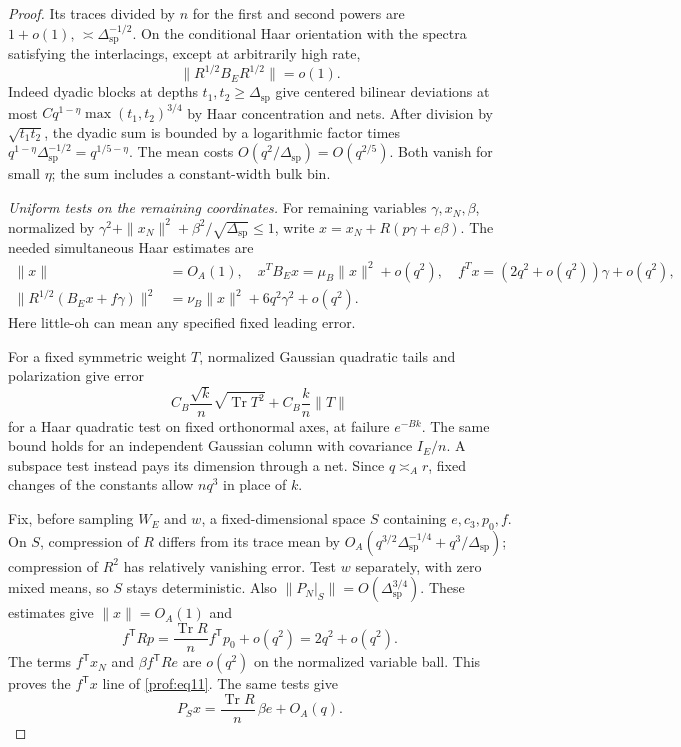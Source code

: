 \begin{proof}
Its traces divided by \(n\) for the first and second powers are \(1+o(1),\,\asymp \Delta_{\mathrm{sp}}^{-1/2}\). On the conditional Haar orientation with the spectra satisfying the interlacings, except at arbitrarily high rate,
\[
 \|R^{1/2}B_E R^{1/2}\|=o(1).
\]
Indeed dyadic blocks at depths $t_1,t_2\ge\Delta_{\mathrm{sp}}$ give
centered bilinear deviations at most
$Cq^{1-\eta}\max(t_1,t_2)^{3/4}$ by Haar concentration and nets.
After division by $\sqrt{t_1t_2}$, the dyadic sum is bounded by a
logarithmic factor times
$q^{1-\eta}\Delta_{\mathrm{sp}}^{-1/2}
=q^{1/5-\eta}$. The mean costs
$O(q^2/\Delta_{\mathrm{sp}})=O(q^{2/5})$. Both vanish for small
$\eta$; the sum includes a constant-width bulk bin.

\par\smallskip\noindent\textit{Uniform tests on the remaining coordinates.}\enspace
For remaining variables \(\gamma,x_N,\beta\), normalized by \(\gamma^2+\|x_N\|^2+\beta^2/\sqrt{\Delta_{\mathrm{sp}}}\le1\), write \(x=x_N+R(p\gamma+e\beta)\). The needed simultaneous Haar estimates are
\begin{equation}\label{prof:eq11}
\begin{split}
 \|x\|&=O_A(1),\quad x^TB_E x=\mu_B\|x\|^2+o(q^2),\quad
 f^T x= (2q^2+o(q^2))\gamma+o(q^2),\\
 \|R^{1/2}(B_E x+f\gamma)\|^2&=\nu_B\|x\|^2+6q^2\gamma^2+o(q^2).
 \end{split}
\end{equation}
Here little-oh can mean any specified fixed leading error.

For a fixed symmetric weight $T$, normalized Gaussian quadratic tails
and polarization give error
\[
 C_B\frac{\sqrt k}{n}\sqrt{\operatorname{Tr}T^2}
       +C_B\frac{k}{n}\|T\|
\]
for a Haar quadratic test on fixed orthonormal axes, at failure
$e^{-Bk}$. The same bound holds for an independent Gaussian column
with covariance $I_E/n$. A subspace test instead pays its dimension
through a net. Since $q\asymp_A r$, fixed changes of the constants
allow $nq^3$ in place of $k$.

Fix, before sampling $W_E$ and $w$, a fixed-dimensional space $S$
containing $e,c_3,p_0,f$. On $S$, compression of $R$ differs from its
trace mean by
$O_A(q^{3/2}\Delta_{\mathrm{sp}}^{-1/4}+q^3/\Delta_{\mathrm{sp}})$;
compression of $R^2$ has relatively vanishing error. Test $w$
separately, with zero mixed means, so $S$ stays deterministic. Also
$\|P_N|_S\|=O(\Delta_{\mathrm{sp}}^{3/4})$.
These estimates give $\|x\|=O_A(1)$ and
\[
 f^{\mathsf T}Rp
 =\frac{\operatorname{Tr}R}{n}f^{\mathsf T}p_0+o(q^2)
 =2q^2+o(q^2).
\]
The terms $f^{\mathsf T}x_N$ and $\beta f^{\mathsf T}Re$ are $o(q^2)$
on the normalized variable ball. This proves the $f^{\mathsf T}x$
line of \eqref{prof:eq11}. The same tests give
\[
 P_Sx=\frac{\operatorname{Tr}R}{n}\,\beta e+O_A(q).
\]


\end{proof}
